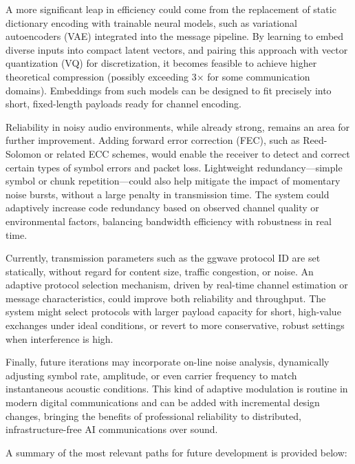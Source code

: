 \documentclass[12pt,openany]{article}
\theoremstyle{definition}
\theoremstyle{definition}
\theoremstyle{definition}
\begin{document}
A more significant leap in efficiency could come from the replacement of static dictionary encoding with trainable neural models, such as variational autoencoders (VAE) integrated into the message pipeline. By learning to embed diverse inputs into compact latent vectors, and pairing this approach with vector quantization (VQ) for discretization, it becomes feasible to achieve higher theoretical compression (possibly exceeding 3× for some communication domains). Embeddings from such models can be designed to fit precisely into short, fixed-length payloads ready for channel encoding.

Reliability in noisy audio environments, while already strong, remains an area for further improvement. Adding forward error correction (FEC), such as Reed-Solomon or related ECC schemes, would enable the receiver to detect and correct certain types of symbol errors and packet loss. Lightweight redundancy—simple symbol or chunk repetition—could also help mitigate the impact of momentary noise bursts, without a large penalty in transmission time. The system could adaptively increase code redundancy based on observed channel quality or environmental factors, balancing bandwidth efficiency with robustness in real time.

Currently, transmission parameters such as the ggwave protocol ID are set statically, without regard for content size, traffic congestion, or noise. An adaptive protocol selection mechanism, driven by real-time channel estimation or message characteristics, could improve both reliability and throughput. The system might select protocols with larger payload capacity for short, high-value exchanges under ideal conditions, or revert to more conservative, robust settings when interference is high.

Finally, future iterations may incorporate on-line noise analysis, dynamically adjusting symbol rate, amplitude, or even carrier frequency to match instantaneous acoustic conditions. This kind of adaptive modulation is routine in modern digital communications and can be added with incremental design changes, bringing the benefits of professional reliability to distributed, infrastructure-free AI communications over sound.

A summary of the most relevant paths for future development is provided below:
\end{document}
